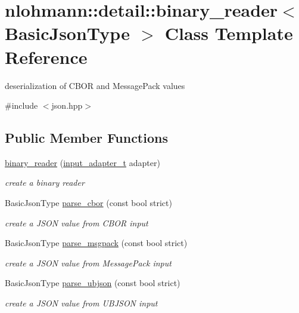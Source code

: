 \hypertarget{classnlohmann_1_1detail_1_1binary__reader}{}\section{nlohmann\+:\+:detail\+:\+:binary\+\_\+reader$<$ Basic\+Json\+Type $>$ Class Template Reference}
\label{classnlohmann_1_1detail_1_1binary__reader}


deserialization of C\+B\+OR and Message\+Pack values  




{\ttfamily \#include $<$json.\+hpp$>$}

\subsection*{Public Member Functions}
\begin{DoxyCompactItemize}
\item 
\hyperlink{classnlohmann_1_1detail_1_1binary__reader_a7e643baadaf4c31718cd74833bdd542f}{binary\+\_\+reader} (\hyperlink{namespacenlohmann_1_1detail_ae132f8cd5bb24c5e9b40ad0eafedf1c2}{input\+\_\+adapter\+\_\+t} adapter)
\begin{DoxyCompactList}\small\item\em create a binary reader \end{DoxyCompactList}\item 
Basic\+Json\+Type \hyperlink{classnlohmann_1_1detail_1_1binary__reader_a04bcdc8f55b26fafa9775a2f89e48fc2}{parse\+\_\+cbor} (const bool strict)
\begin{DoxyCompactList}\small\item\em create a J\+S\+ON value from C\+B\+OR input \end{DoxyCompactList}\item 
Basic\+Json\+Type \hyperlink{classnlohmann_1_1detail_1_1binary__reader_ab4a4a6f5ab3cc77aac374c9c889e580e}{parse\+\_\+msgpack} (const bool strict)
\begin{DoxyCompactList}\small\item\em create a J\+S\+ON value from Message\+Pack input \end{DoxyCompactList}\item 
Basic\+Json\+Type \hyperlink{classnlohmann_1_1detail_1_1binary__reader_ad0be02d1df4ba4fbe601b0985f5300ac}{parse\+\_\+ubjson} (const bool strict)
\begin{DoxyCompactList}\small\item\em create a J\+S\+ON value from U\+B\+J\+S\+ON input \end{DoxyCompactList}\end{DoxyCompactItemize}
